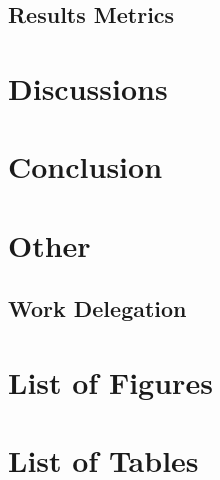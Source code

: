 \documentclass[11pt]{article}
\begin{document}
        \subsection{Results Metrics}
    
    \FloatBarrier
    \section{Discussions}

    \FloatBarrier
    \section{Conclusion}

    \FloatBarrier
    \section{Other}
        \subsection{Work Delegation}

    \FloatBarrier
    \appendix
    
	

	\section{List of Figures}
		\makeatletter
		\makeatother

	\section{List of Tables}
		\makeatletter
		\makeatother
\end{document}
